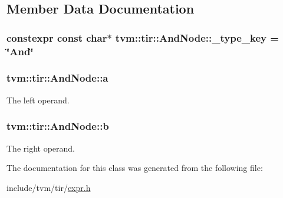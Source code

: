 \subsection{Member Data Documentation}
\subsubsection[{\texorpdfstring{\+\_\+type\+\_\+key}{_type_key}}]{\setlength{\rightskip}{0pt plus 5cm}constexpr const char$\ast$ tvm\+::tir\+::\+And\+Node\+::\+\_\+type\+\_\+key = \char`\"{}And\char`\"{}\hspace{0.3cm}{\ttfamily [static]}}\hypertarget{classtvm_1_1tir_1_1AndNode_a6ea58bbd932087818ed84621065d73a0}{}\label{classtvm_1_1tir_1_1AndNode_a6ea58bbd932087818ed84621065d73a0}
\subsubsection[{\texorpdfstring{a}{a}}]{ tvm\+::tir\+::\+And\+Node\+::a}\hypertarget{classtvm_1_1tir_1_1AndNode_a4a9b2cf4384567cf6719a4766a679738}{}\label{classtvm_1_1tir_1_1AndNode_a4a9b2cf4384567cf6719a4766a679738}


The left operand. 

\subsubsection[{\texorpdfstring{b}{b}}]{ tvm\+::tir\+::\+And\+Node\+::b}\hypertarget{classtvm_1_1tir_1_1AndNode_a9e1e2e65410c1c3ed43538f475f23d83}{}\label{classtvm_1_1tir_1_1AndNode_a9e1e2e65410c1c3ed43538f475f23d83}


The right operand. 



The documentation for this class was generated from the following file\+:\begin{DoxyCompactItemize}
\item 
include/tvm/tir/\hyperlink{tir_2expr_8h}{expr.\+h}\end{DoxyCompactItemize}
